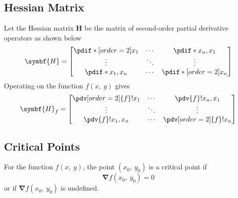 \documentclass{article}
\begin{document}
\subsection{Hessian Matrix}
\begin{definition}
    Let the Hessian matrix \(\symbf{H}\) be the matrix of second-order
    partial derivative operators as shown below
    \begin{equation*}
        \symbf{H} =
        \begin{bmatrix}
            \pdif*[order=2]{x_1} & \cdots & \pdif*{x_n,x_1}      \\
            \vdots               & \ddots & \vdots               \\
            \pdif*{x_1,x_n}      & \cdots & \pdif*[order=2]{x_n}
        \end{bmatrix}
    \end{equation*}
    Operating on the function \(f\left( x,\: y \right)\) gives
    \begin{equation*}
        \symbf{H}_f =
        \begin{bmatrix}
            \pdv[order=2]{f}!{x_1} & \cdots & \pdv{f}!{x_n,x_1}      \\
            \vdots                 & \ddots & \vdots                 \\
            \pdv{f}!{x_1,x_n}      & \cdots & \pdv[order=2]{f}!{x_n}
        \end{bmatrix}
    \end{equation*}
\end{definition}
\subsection{Critical Points}
For the function \(f\left( x,\: y \right)\), the point \(\left( x_0,\:
y_0 \right)\) is a critical point if
\begin{equation*}
    \symbf{\nabla}f\left( x_0,\: y_0 \right) = 0
\end{equation*}
or if \(\symbf{\nabla}f\left( x_0,\: y_0 \right)\) is undefined.
\end{document}
